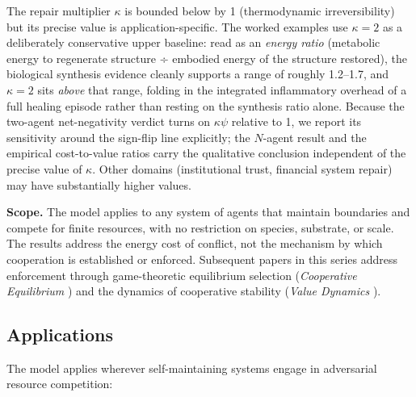 \documentclass[11pt]{article}
\theoremstyle{plain}
\theoremstyle{definition}
\theoremstyle{remark}
\let\origsubsection\subsection
\renewcommand{\subsection}{\needspace{7\baselineskip}\origsubsection}
\begin{document}
The repair multiplier \(\kappa\) is bounded below by 1 (thermodynamic
irreversibility) but its precise value is application-specific. The
worked examples use \(\kappa = 2\) as a deliberately conservative upper
baseline: read as an \emph{energy ratio} (metabolic energy to regenerate
structure ÷ embodied energy of the structure restored), the biological
synthesis evidence cleanly supports a range of roughly 1.2--1.7, and
\(\kappa = 2\) sits \emph{above} that range, folding in the integrated
inflammatory overhead of a full healing episode rather than resting on
the synthesis ratio alone. Because the two-agent net-negativity verdict
turns on \(\kappa\psi\) relative to 1, we report its sensitivity around
the sign-flip line explicitly; the \(N\)-agent result and the empirical
cost-to-value ratios carry the qualitative conclusion independent of the
precise value of \(\kappa\). Other domains (institutional trust,
financial system repair) may have substantially higher values.

\textbf{Scope.} The model applies to any system of agents that maintain
boundaries and compete for finite resources, with no restriction on
species, substrate, or scale. The results address the energy cost of
conflict, not the mechanism by which cooperation is established or
enforced. Subsequent papers in this series address enforcement through
game-theoretic equilibrium selection (\emph{Cooperative Equilibrium}
\citep{TC-V}) and the dynamics of cooperative stability (\emph{Value
Dynamics} \citep{TC-VI}).

\subsection{Applications}\label{applications}

The model applies wherever self-maintaining systems engage in
adversarial resource competition:
\end{document}
